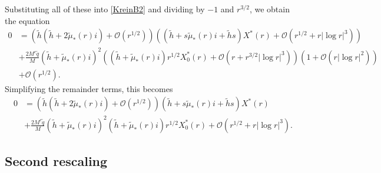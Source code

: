 \documentclass[thesis.tex]{subfiles}
\begin{document}
Substituting all of these into \cref{KreinB2} and dividing by $-1$ and $r^{3/2}$, we obtain the equation
\begin{equation*}
\begin{aligned}
0 &= \left( \tilde{h} ( \tilde{h} + 2 \tilde{\mu}_*(r) i) +  \mathcal{O}( r^{1/2} )\right) \left( (\tilde{h} + s \tilde{\mu}_*(r) i + \tilde{h} s)X^*(r) + \mathcal{O}\left( r^{1/2} + r|\log r|^3 \right)  \right) \\
&+\frac{2 M^c\tilde{q}}{M} ( \tilde{h} + \tilde{\mu}_*(r) i)^2 \left( (\tilde{h} + \tilde{\mu}_*(r)i )r^{1/2} X_0^*(r) + \mathcal{O}(r + r^{3/2} |\log r|^3 ) \right) \left( 1 + \mathcal{O}\left( r |\log r|^2 \right) \right) \\
&+ \mathcal{O}( r^{1/2} ).
\end{aligned}
\end{equation*}
Simplifying the remainder terms, this becomes
\begin{equation*}\label{KreinB3}
\begin{aligned}
0 &= \left( \tilde{h} ( \tilde{h} + 2 \tilde{\mu}_*(r) i) + \mathcal{O}( r^{1/2} )\right) (\tilde{h} + s \tilde{\mu}_*(r) i + \tilde{h} s)X^*(r) \\
&+\frac{2 M^c\tilde{q}}{M} ( \tilde{h} + \tilde{\mu}_*(r) i)^2 (\tilde{h} + \tilde{\mu}_*(r)i )r^{1/2} X_0^*(r) +  \mathcal{O}\left( r^{1/2} + r |\log r|^3 \right).
\end{aligned}
\end{equation*}

\subsection{Second rescaling}
\end{document}

